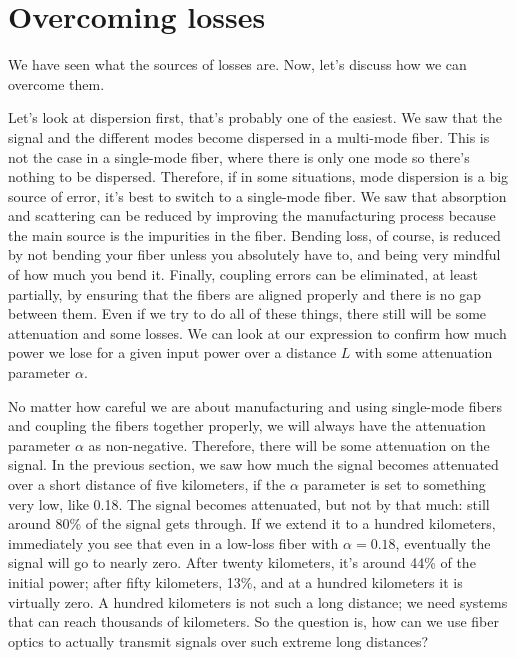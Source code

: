 \section{Overcoming losses}
\label{sec:11-4_overcoming_losses}

We have seen what the sources of losses are. Now, let's discuss how we can overcome them.

Let's look at dispersion first, that's probably one of the easiest. We saw that the signal and the different modes become dispersed in a multi-mode fiber. This is not the case in a single-mode fiber, where there is only one mode so there's nothing to be dispersed. Therefore, if in some situations, mode dispersion is a big source of error, it's best to switch to a single-mode fiber. We saw that absorption and scattering can be reduced by improving the manufacturing process because the main source is the impurities in the fiber. Bending loss, of course, is reduced by not bending your fiber unless you absolutely have to, and being very mindful of how much you bend it. Finally, coupling errors can be eliminated, at least partially, by ensuring that the fibers are aligned properly and there is no gap between them. Even if we try to do all of these things, there still will be some attenuation and some losses. We can look at  our expression to confirm how much power we lose for a given input power over a distance $L$ with some attenuation parameter $\alpha$.

No matter how careful we are about manufacturing and using single-mode fibers and coupling the fibers together properly, we will always have the attenuation parameter $\alpha$ as non-negative. Therefore, there will be some attenuation on the signal. In the previous section, we saw how much the signal becomes attenuated over a short distance of five kilometers, if the $\alpha$ parameter is set to something very low, like 0.18. The signal becomes attenuated, but not by that much: still around 80\% of the signal gets through. If we extend it to a hundred kilometers, immediately you see that even in a low-loss fiber with $\alpha = 0.18$, eventually the signal will go to nearly zero. After twenty kilometers, it's around 44\% of the initial power; after  fifty kilometers, 13\%, and at a hundred kilometers it is virtually zero. A hundred kilometers is not such a long distance; we need systems that can reach thousands of kilometers. So the question is, how can we use fiber optics to actually transmit signals over such extreme long distances?

